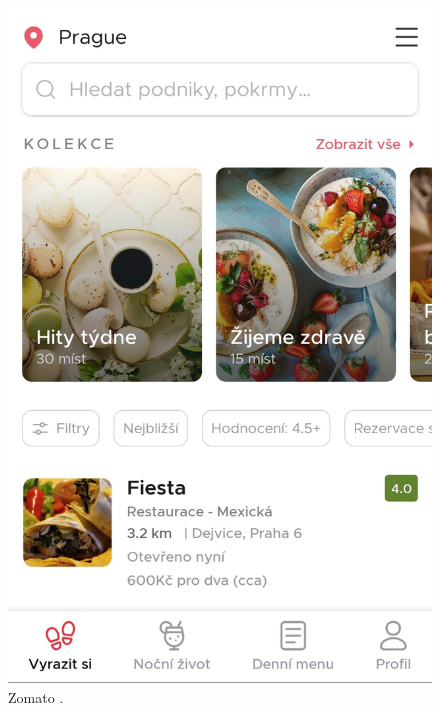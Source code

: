 \begin{figure}[ht]
    \centering
    \begin{minipage}{0.45\linewidth}
       \centering
    \includegraphics[width=0.75\linewidth]{img/analysis/app-zomato.jpg}
    \caption{Zomato \cite{app-zomato}.}
    \label{fig:zomato}
    \end{minipage}\hfill
    \begin{minipage}{0.45\linewidth}
        \centering

\end{minipage}
\end{figure}

